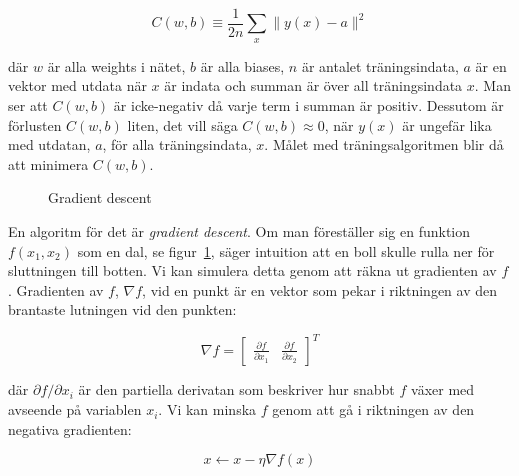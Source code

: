 \begin{equation} \label{eq:cost}
	C(w, b) \equiv \frac{1}{2n} \displaystyle\sum_x \lVert y(x) - a \rVert^2
\end{equation}

där $ w $ är alla weights i nätet, $ b $ är alla biases,
$ n $ är antalet träningsindata, $ a $ är en vektor med utdata när $ x $ är indata
och summan är över all träningsindata $ x $.
Man ser att $ C(w, b) $ är icke-negativ då varje term i summan är positiv.
Dessutom är förlusten $ C(w, b) $ liten, det vill säga $ C(w, b) \approx 0 $,
när $ y(x) $ är ungefär lika med utdatan, $ a $, för alla träningsindata, $ x $.
Målet med träningsalgoritmen blir då att minimera $ C(w, b) $.

\begin{figure}
	\centering
	\caption{Gradient descent}
	\label{fig:descent}
\end{figure}

En algoritm för det är \emph{gradient descent}.
Om man föreställer sig en funktion $ f(x_1, x_2) $ som en dal,
se figur~\ref{fig:descent},
säger intuition att en boll skulle rulla ner för sluttningen till botten.
Vi kan simulera detta genom att räkna ut gradienten av $ f $.
Gradienten av $ f $, $ \nabla f $, vid en punkt är en vektor
som pekar i riktningen av den brantaste lutningen vid den punkten:

\begin{equation}
	\nabla f = \begin{bmatrix} \frac{\partial f}{\partial x_1} & \frac{\partial f}{\partial x_2} \end{bmatrix}^{T}
\end{equation}

där $ \partial f / \partial x_i $ är den partiella derivatan
som beskriver hur snabbt $ f $ växer med avseende på variablen $ x_i $.
Vi kan minska $ f $ genom att gå i riktningen av den negativa gradienten:

\begin{equation}
	x \leftarrow x - \eta \nabla f(x)
\end{equation}


